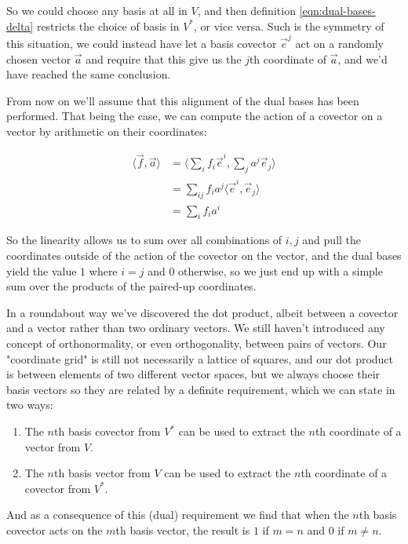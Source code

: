 So we could choose any basis at all in $V$, and then definition \eqref{eqn:dual-bases-delta} restricts the choice of basis in $V^*$, or vice versa. Such is the symmetry of this situation, we could instead have let a basis covector $\vec{e}^j$ act on a randomly chosen vector $\vec{a}$ and require that this give us the $j$th coordinate of $\vec{a}$, and we'd have reached the same conclusion.

From now on we'll assume that this alignment of the dual bases has been performed. That being the case, we can compute the action of a covector on a vector by arithmetic on their coordinates:

\begin{equation}
    \begin{split}
        \langle \vec{f},\vec{a}\rangle 
        &= \langle \sum_i f_i \vec{e}^i , \sum_j a^j \vec{e}_j \rangle \\
        &= \sum_{ij} f_i a^j \langle\vec{e}^i,\vec{e}_j\rangle \\
        &= \sum_{i} f_i a^i
    \end{split}
\end{equation}

So the linearity allows us to sum over all combinations of $i, j$ and pull the coordinates outside of the action of the covector on the vector, and the dual bases yield the value $1$ where $i = j$ and $0$ otherwise, so we just end up with a simple sum over the products of the paired-up coordinates.

In a roundabout way we've discovered the dot product, albeit between a covector and a vector rather than two ordinary vectors. We still haven't introduced any concept of orthonormality, or even orthogonality, between pairs of vectors. Our "coordinate grid" is still not necessarily a lattice of squares, and our dot product is between elements of two different vector spaces, but we always choose their basis vectors so they are related by a definite requirement, which we can state in two ways:

\begin{enumerate}
    \item The $n$th basis covector from $V^*$ can be used to extract the $n$th coordinate of a vector from $V$.
    \item The $n$th basis vector from $V$ can be used to extract the $n$th coordinate of a covector from $V^*$.
\end{enumerate}

And as a consequence of this (dual) requirement we find that when the $n$th basis covector acts on the $m$th basis vector, the result is $1$ if $m = n$ and $0$ if $m \ne n$.


